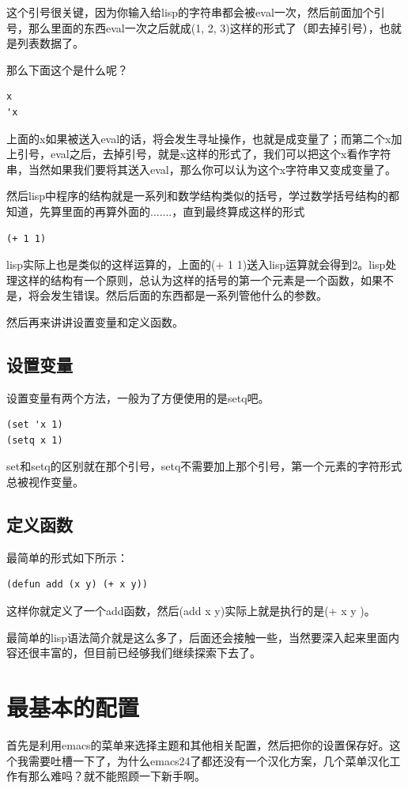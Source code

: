 \documentclass[11pt,oneside]{book}
\begin{document}
这个引号很关键，因为你输入给lisp的字符串都会被eval一次，然后前面加个引号，那么里面的东西eval一次之后就成(1, 2, 3)这样的形式了（即去掉引号），也就是列表数据了。

那么下面这个是什么呢？
\begin{Verbatim}
x
'x
\end{Verbatim}
上面的x如果被送入eval的话，将会发生寻址操作，也就是成变量了；而第二个x加上引号，eval之后，去掉引号，就是x这样的形式了，我们可以把这个x看作字符串，当然如果我们要将其送入eval，那么你可以认为这个x字符串又变成变量了。

然后lisp中程序的结构就是一系列和数学结构类似的括号，学过数学括号结构的都知道，先算里面的再算外面的.......，直到最终算成这样的形式
\begin{Verbatim}
(+ 1 1)
\end{Verbatim}
lisp实际上也是类似的这样运算的，上面的(+ 1 1)送入lisp运算就会得到2。lisp处理这样的结构有一个原则，总认为这样的括号的第一个元素是一个函数，如果不是，将会发生错误。然后后面的东西都是一系列管他什么的参数。

然后再来讲讲设置变量和定义函数。
\subsection{设置变量}
设置变量有两个方法，一般为了方便使用的是setq吧。
\begin{Verbatim}
(set 'x 1)
(setq x 1)
\end{Verbatim}
set和setq的区别就在那个引号，setq不需要加上那个引号，第一个元素的字符形式总被视作变量。

\subsection{定义函数}
最简单的形式如下所示：
\begin{Verbatim}
(defun add (x y) (+ x y))
\end{Verbatim}
这样你就定义了一个add函数，然后(add x y)实际上就是执行的是(+ x y )。

最简单的lisp语法简介就是这么多了，后面还会接触一些，当然要深入起来里面内容还很丰富的，但目前已经够我们继续探索下去了。

\section{最基本的配置}
首先是利用emacs的菜单来选择主题和其他相关配置，然后把你的设置保存好。这个我需要吐槽一下了，为什么emacs24了都还没有一个汉化方案，几个菜单汉化工作有那么难吗？就不能照顾一下新手啊。
\end{document}

